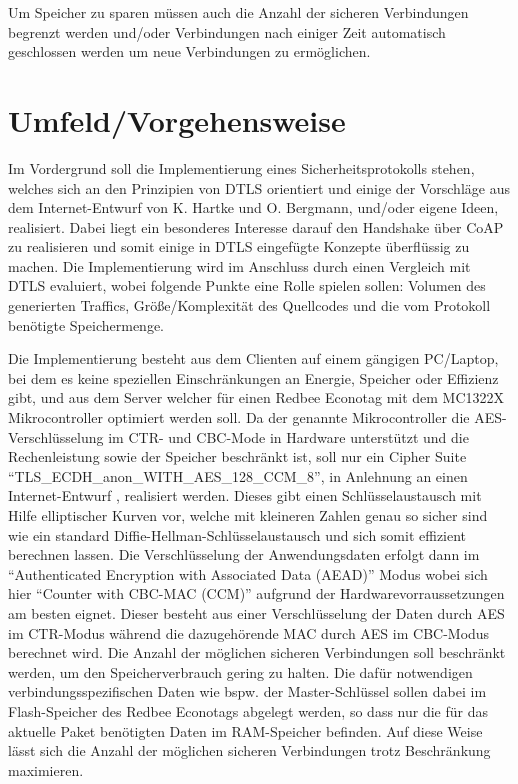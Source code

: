 \documentclass[a4paper,10pt]{report}
\begin{document}
Um Speicher zu sparen müssen auch die Anzahl der sicheren Verbindungen begrenzt werden und/oder Verbindungen nach einiger Zeit
automatisch geschlossen werden um neue Verbindungen zu ermöglichen.



\section{Umfeld/Vorgehensweise}
Im Vordergrund soll die Implementierung eines Sicherheitsprotokolls stehen, welches sich an den Prinzipien von DTLS orientiert
und einige der Vorschläge aus dem Internet-Entwurf von K. Hartke und O. Bergmann, und/oder eigene Ideen, realisiert.
Dabei liegt ein besonderes Interesse darauf den Handshake über CoAP zu realisieren und somit einige in DTLS eingefügte Konzepte überflüssig zu machen.
Die Implementierung wird im Anschluss durch einen Vergleich mit DTLS evaluiert, wobei folgende Punkte eine Rolle spielen sollen:
Volumen des generierten Traffics, Größe/Komplexität des Quellcodes und die vom Protokoll benötigte Speichermenge.

Die Implementierung besteht aus dem Clienten auf einem gängigen PC/Laptop, bei dem es keine speziellen Einschränkungen an Energie,
Speicher oder Effizienz gibt, und aus dem Server welcher für einen Redbee Econotag \cite{econotag} mit dem MC1322X
Mikrocontroller \cite{mc1322x} optimiert werden soll. Da der genannte Mikrocontroller die AES-Verschlüsselung im CTR- und CBC-Mode
in Hardware unterstützt und die Rechenleistung sowie der Speicher beschränkt ist, soll nur ein Cipher Suite "`TLS\_ECDH\_anon\_WITH\_AES\_128\_CCM\_8"',
in Anlehnung an einen Internet-Entwurf \cite{draftaesecc}, realisiert werden. Dieses gibt einen Schlüsselaustausch mit Hilfe elliptischer
Kurven vor, welche mit kleineren Zahlen genau so sicher sind wie ein standard Diffie-Hellman-Schlüsselaustausch und sich somit effizient berechnen
lassen. Die Verschlüsselung der Anwendungsdaten erfolgt dann im "`Authenticated Encryption with Associated Data (AEAD)"' Modus \cite{rfc5116}
wobei sich hier "`Counter with CBC-MAC (CCM)"' \cite{rfc3610} aufgrund der Hardwarevorraussetzungen am besten eignet. Dieser besteht
aus einer Verschlüsselung der Daten durch AES im CTR-Modus während die dazugehörende MAC durch AES im CBC-Modus berechnet wird.
Die Anzahl der möglichen sicheren Verbindungen soll beschränkt werden, um den Speicherverbrauch gering zu halten.
Die dafür notwendigen verbindungsspezifischen Daten wie bspw. der Master-Schlüssel sollen dabei im Flash-Speicher des Redbee Econotags
abgelegt werden, so dass nur die für das aktuelle Paket benötigten Daten im RAM-Speicher befinden. Auf diese Weise lässt sich
die Anzahl der möglichen sicheren Verbindungen trotz Beschränkung maximieren.
\end{document}
